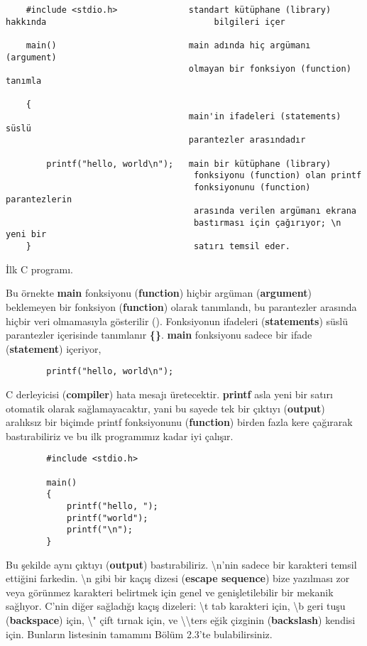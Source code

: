 \documentclass[a4paper,12pt,oneside]{book}
\begin{document}
\begin{lstlisting}
    #include <stdio.h>              standart kütüphane (library) hakkında                                 bilgileri içer

    main()                          main adında hiç argümanı (argument)
                                    olmayan bir fonksiyon (function) tanımla

    {
                                    main'in ifadeleri (statements) süslü
                                    parantezler arasındadır

        printf("hello, world\n");   main bir kütüphane (library)
                                     fonksiyonu (function) olan printf
                                     fonksiyonunu (function) parantezlerin
                                     arasında verilen argümanı ekrana
                                     bastırması için çağırıyor; \n yeni bir
    }                                satırı temsil eder.
\end{lstlisting}
\begin{center}İlk C programı.\end{center}
\pagebreak

Bu örnekte \textbf{main} fonksiyonu (\textbf{function}) hiçbir argüman (\textbf{argument}) beklemeyen bir fonksiyon (\textbf{function}) olarak tanımlandı, bu parantezler arasında hiçbir veri olmamasıyla gösterilir ().
Fonksiyonun ifadeleri (\textbf{statements}) süslü parantezler içerisinde tanımlanır \textbf{\{\}}. \textbf{main} fonksiyonu sadece bir ifade (\textbf{statement}) içeriyor,
\begin{lstlisting}
		printf("hello, world\n");
\end{lstlisting}
C derleyicisi (\textbf{compiler}) hata mesajı üretecektir.
\textbf{printf} asla yeni bir satırı otomatik olarak sağlamayacaktır, yani bu sayede tek bir çıktıyı (\textbf{output}) aralıksız bir biçimde printf fonksiyonunu (\textbf{function}) birden fazla kere çağırarak bastırabiliriz ve bu ilk programımız kadar iyi çalışır.

\begin{lstlisting}
		#include <stdio.h>

		main()
		{
			printf("hello, ");
			printf("world");
			printf("\n");
		}
\end{lstlisting}

Bu şekilde aynı çıktıyı (\textbf{output}) bastırabiliriz.
\textbackslash n'nin sadece bir karakteri temsil ettiğini farkedin. \textbackslash n  gibi bir kaçış dizesi (\textbf{escape sequence}) bize yazılması zor veya görünmez karakteri belirtmek için genel ve genişletilebilir bir mekanik sağlıyor. C'nin diğer sağladığı kaçış dizeleri: \textbackslash t tab karakteri için, \textbackslash b geri tuşu (\textbf{backspace}) için, \textbackslash " çift tırnak için, ve  \textbackslash \textbackslash \hspace*{1mm}ters eğik çizginin (\textbf{backslash}) kendisi için. Bunların listesinin tamamını Bölüm 2.3'te bulabilirsiniz. \\
\end{document}

